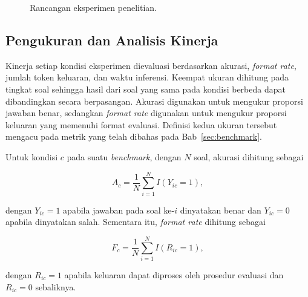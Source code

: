 \begin{figure}[H]
    \caption{Rancangan eksperimen penelitian.}
    \label{fig:rancangan-eksperimen}
\end{figure}

\subsection{Pengukuran dan Analisis Kinerja}
\label{subsec:pengukuran-analisis-kinerja}

Kinerja setiap kondisi eksperimen dievaluasi berdasarkan akurasi, \textit{format
rate}, jumlah token keluaran, dan waktu inferensi. Keempat ukuran dihitung pada
tingkat soal sehingga hasil dari soal yang sama pada kondisi berbeda dapat
dibandingkan secara berpasangan. Akurasi digunakan untuk mengukur proporsi
jawaban benar, sedangkan \textit{format rate} digunakan untuk mengukur proporsi
keluaran yang memenuhi format evaluasi. Definisi kedua ukuran tersebut mengacu
pada metrik yang telah dibahas pada Bab~\ref{sec:benchmark}.

Untuk kondisi $c$ pada suatu \textit{benchmark}, dengan $N$ soal, akurasi
dihitung sebagai

\begin{equation}
    A_c =
    \frac{1}{N}\sum_{i=1}^{N} I(Y_{ic}=1),
    \label{eq:akurasi-eksperimen}
\end{equation}

dengan $Y_{ic}=1$ apabila jawaban pada soal ke-$i$ dinyatakan benar dan
$Y_{ic}=0$ apabila dinyatakan salah. Sementara itu, \textit{format rate}
dihitung sebagai

\begin{equation}
    F_c =
    \frac{1}{N}\sum_{i=1}^{N} I(R_{ic}=1),
    \label{eq:format-rate-eksperimen}
\end{equation}

dengan $R_{ic}=1$ apabila keluaran dapat diproses oleh prosedur evaluasi dan
$R_{ic}=0$ sebaliknya.

